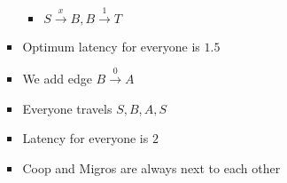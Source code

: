 \begin{itemize}
\begin{itemize}
\begin{itemize}
\begin{itemize}
                            \item $S \overset{x}{\to} B, B \overset{1}{\to} T$
                        \end{itemize}
                     \item Optimum latency for everyone is $1.5$
                     \item We add edge $B \overset{0}{\to} A$
                     \item Everyone travels $S, B, A, S$
                     \item Latency for everyone is $2$
                \end{itemize}
                \begin{itemize}
                    \item Coop and Migros are always next to each other
                \end{itemize}
        \end{itemize}
\end{itemize}
